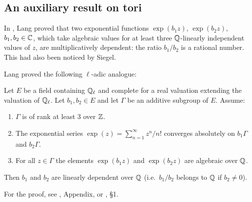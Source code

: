 \subsection{An auxiliary result on tori}
\label{sec:III_33}
In \cite{15}, Lang proved that two exponential functions $\exp(b_1 z)$,
$\exp(b_2z)$, $b_1, b_2 \in \mathbb{C}$, which take algebraic values for at least three
$\mathbb{Q}$-linearly independent values of $z$, are multiplicatively dependent: the
ratio $b_1/b_2$ is a rational number. This had also been noticed by Siegel.

Lang proved the following $\ell$-adic analogue:
\begin{prop}\label{prop:III_33_1}
Let $E$ be a field containing $\mathbb{Q}_\ell$ and complete for a real valuation
extending the valuation of $\mathbb{Q}_\ell$. Let $b_1, b_2 \in E$ and let $\Gamma$ be
an additive subgroup of $E$. Assume:
\begin{enumerate}
	\item $\Gamma$ is of rank at least 3 over $\mathbb{Z}$.
	\item The exponential series $\exp(z) = \sum_{n=1}^{\infty} z^n/n!$
		converges absolutely on $b_1 \Gamma$ and $b_2 \Gamma$.
	\item For all $z \in \Gamma$ the elements $\exp(b_1z)$ and $\exp(b_2z)$ are
	algebraic over $\mathbb{Q}$.
\end{enumerate}
Then $b_1$ and $b_2$ are linearly dependent over $\mathbb{Q}$ (i.e.\ $b_1/b_2$ belongs
to $\mathbb{Q}$ if $b_2 \ne 0$).
\end{prop}
For the proof, see \cite{15}, Appendix, or \cite{30}, \S 1.

